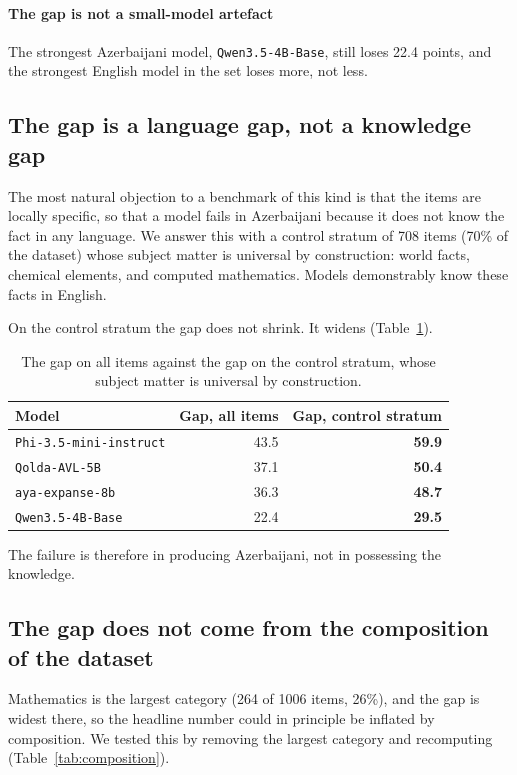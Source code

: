 \documentclass[final]{clv2025}
\begin{document}
\paragraph{The gap is not a small-model artefact} The strongest Azerbaijani
model, \texttt{Qwen3.5-4B-Base}, still loses 22.4 points, and the strongest
English model in the set loses more, not less.

\subsection{The gap is a language gap, not a knowledge gap}

The most natural objection to a benchmark of this kind is that the items are
locally specific, so that a model fails in Azerbaijani because it does not know
the fact in any language. We answer this with a control stratum of 708 items
(70\% of the dataset) whose subject matter is universal by construction: world
facts, chemical elements, and computed mathematics. Models demonstrably know
these facts in English.

On the control stratum the gap does not shrink. It widens
(Table~\ref{tab:control}).

\begin{table}[h!]
\caption{The gap on all items against the gap on the control stratum, whose
subject matter is universal by construction.}
\label{tab:control}
\centering
\begin{tabular}{lrr}
\toprule
Model & Gap, all items & Gap, control stratum \\
\midrule
\texttt{Phi-3.5-mini-instruct} & 43.5 & \textbf{59.9} \\
\texttt{Qolda-AVL-5B} & 37.1 & \textbf{50.4} \\
\texttt{aya-expanse-8b} & 36.3 & \textbf{48.7} \\
\texttt{Qwen3.5-4B-Base} & 22.4 & \textbf{29.5} \\
\bottomrule
\end{tabular}
\end{table}

The failure is therefore in producing Azerbaijani, not in possessing the
knowledge.

\subsection{The gap does not come from the composition of the dataset}

Mathematics is the largest category (264 of 1006 items, 26\%), and the gap is
widest there, so the headline number could in principle be inflated by
composition. We tested this by removing the largest category and
recomputing (Table~\ref{tab:composition}).
\end{document}
